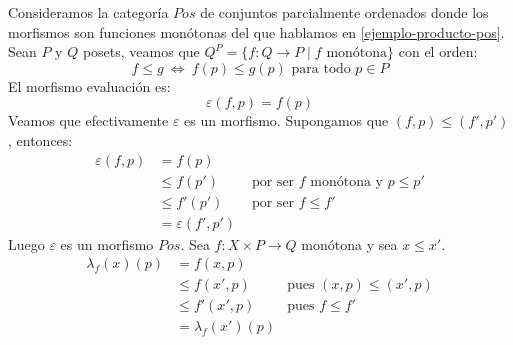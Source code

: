 \documentclass[12pt, twoside]{book}
\newcommand{\sii}{{\ \Leftrightarrow\ }}
\begin{document}
\begin{example}
Consideramos la categoría $Pos$ de conjuntos parcialmente ordenados donde los morfismos son funciones monótonas del que hablamos en \ref{ejemplo-producto-pos}.
Sean $P$ y $Q$ posets, veamos que $Q^P = \{ f \colon Q \to P \mid f \text{ monótona}\}$ con el orden:
\[ f \leq g \sii f(p) \leq g(p) \text{ para todo }p \in P \]
El morfismo evaluación es:
\[ \varepsilon (f,p) = f(p) \]
Veamos que efectivamente $\varepsilon$ es un morfismo.
Supongamos que $(f,p) \leq (f',p')$, entonces:
\begin{align*}
\varepsilon(f,p) & = f(p) & \\
& \leq f(p') & \text{ por ser }f\text{ monótona y }p\leq p'\\
& \leq f'(p') & \text{ por ser }f \leq f'\\
& = \varepsilon(f',p')
\end{align*}
Luego $\varepsilon$ es un morfismo $Pos$.
Sea $f \colon X \times P \to Q$ monótona y sea $x \leq x'$.
\begin{align*}
\lambda_f(x)(p) & = f(x,p) & \\
& \leq f(x',p) & \text{pues }(x,p) \leq (x',p)\\
& \leq f'(x',p) & \text{pues }f \leq f'\\
& = \lambda_f(x')(p)
\end{align*}
\end{example}
\end{document}
